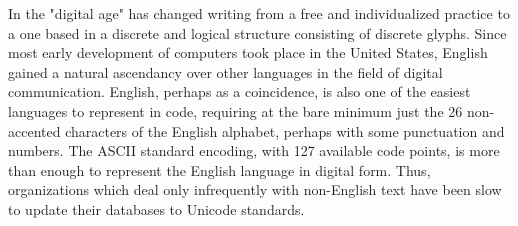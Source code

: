 In the "digital age" has changed writing from a free and individualized practice
to a one based in a discrete and logical structure consisting of discrete
glyphs. Since most early development of computers took place in the United
States, English gained a natural ascendancy over other languages in the field of
digital communication. English, perhaps as a coincidence, is also one of the
easiest languages to represent in code, requiring at the bare minimum just the
26 non-accented characters of the English alphabet, perhaps with some
punctuation and numbers. The ASCII standard encoding, with 127 available code
points, is more than enough to represent the English language in digital form.
Thus, organizations which deal only infrequently with non-English text have been
slow to update their databases to Unicode standards.
